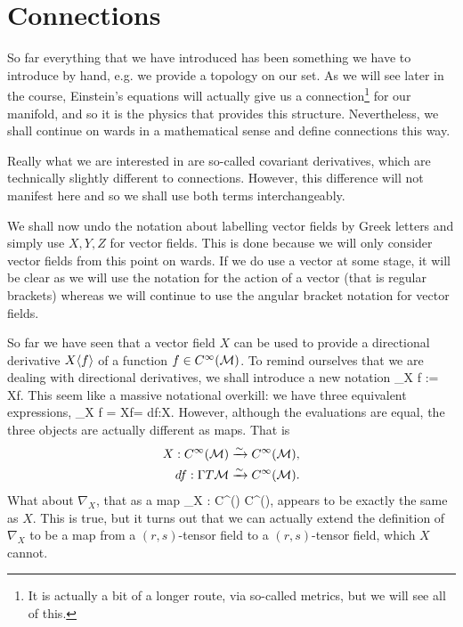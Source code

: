 \chapter{Connections}

So far everything that we have introduced has been something we have to introduce by hand, e.g. we provide a topology on our set. As we will see later in the course, Einstein's equations will actually give us a connection\footnote{It is actually a bit of a longer route, via so-called metrics, but we will see all of this.} for our manifold, and so it is the physics that provides this structure. Nevertheless, we shall continue on wards in a mathematical sense and define connections this way. 

\br 
    Really what we are interested in are so-called covariant derivatives, which are technically slightly different to connections. However, this difference will not manifest here and so we shall use both terms interchangeably. 
\er 

\bnn 
    We shall now undo the notation about labelling vector fields by Greek letters and simply use $X,Y,Z$ for vector fields. This is done because we will only consider vector fields from this point on wards. If we do use a vector at some stage, it will be clear as we will use the notation for the action of a vector (that is regular brackets) whereas we will continue to use the angular bracket notation for vector fields. 
\enn 

So far we have seen that a vector field $X$ can be used to provide a directional derivative $X\langle f\rangle$ of a function $f\in C^{\infty}(\mathcal{M})$. To remind ourselves that we are dealing with directional derivatives, we shall introduce a new notation 
\bse 
    \nabla_X f := X\la f\ra.
\ese 
This seem like a massive notational overkill: we have three equivalent expressions,
\bse
    \nabla_X f = X\la f\ra = df:X.
\ese 
However, although the evaluations are equal, the three objects are actually different as maps. That is
\begin{equation*}
    \begin{split}
        X : C^{\infty}(\mathcal{M}) & \xrightarrow{\sim} C^{\infty}(\mathcal{M}), \\
        df : \Gamma T\mathcal{M} & \xrightarrow{\sim} C^{\infty}(\mathcal{M}).
    \end{split}
\end{equation*}
What about $\nabla_X$, that as a map
\bse 
    \nabla_X : C^{\infty}(\cM) \lmap C^{\infty}(\cM),
\ese 
appears to be exactly the same as $X$. This is true, but it turns out that we can actually extend the definition of $\nabla_X$ to be a map from a $(r,s)$-tensor field to a $(r,s)$-tensor field, which $X$ cannot. 

